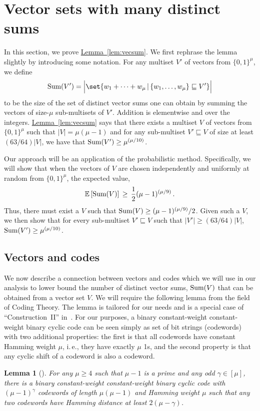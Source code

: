 \documentclass[11pt]{article}
\numberwithin{equation}{section}
\newtheorem{lemma}[theorem]{Lemma}
\theoremstyle{definition}
\theoremstyle{plain}
\newcommand{\ie}{i.\,e.}
\newcommand{\expref}[2]{\hyperref[#2]{#1~\ref{#2}}}
\newcommand{\Vsum}{\ensuremath{\textup{Sum}}}
\newcommand{\ELL}{\ensuremath{\mu}}
\newcommand{\expect}[1]{\mathbb{E}\left[{#1}\right]}
\begin{document}
\section{Vector sets with many distinct sums} \label{sec:proofvecsum}

In this section, we prove \expref{Lemma}{lem:vecsum}.
We first rephrase the lemma slightly by introducing some notation.
For any multiset $V'$ of vectors from $\{0,1\}^\ELL$, we define
\[
\Vsum(V') = \Big| \set{w_1 + \cdots + w_\ELL \,|\, \{w_1,\dots,w_\ELL\} \sqsubseteq  V'} \Big|
\]
to be the size of the  set of distinct vector sums one can obtain by summing the vectors of
%
size-$\mu$    %
sub-multisets of $V'$.
Addition is %
elementwise  %
and over the integers.
\expref{Lemma}{lem:vecsum} says that there exists a multiset $V$ of vectors from     $\{0,1\}^\ELL$ such that $|V|=\ELL(\ELL-1)$ and for any sub-multiset $V'\sqsubseteq V$ of size at least $(63/64)|V|$, we have that $\Vsum(V') \geq \ELL^{(\ELL/10)}$.

Our approach will be an application of the probabilistic method. Specifically, we will show that when the vectors of $V$ are chosen independently and uniformly at random from  $\{0,1\}^\ELL$, the expected value,
\[
\expect{\Vsum(V)}\,\geq\, \frac12 (\ELL-1)^{(\ELL/9)}\,.
\]
Thus, there must exist a $V$ such that $\Vsum(V)\geq (\ELL-1)^{(\ELL/9)}/2$.
Given such a $V$, we then show that for every sub-multiset $V'\sqsubseteq  V$ such that $|V'| \geq (63/64)|V|$,
$\Vsum(V')\geq \ELL^{(\ELL/10)}$.


\subsection{Vectors and codes}

We now describe a connection between vectors and codes which we will use in our analysis to lower bound the number of distinct vector sums, $\Vsum(V)$ that can be obtained from a vector set $V$. We will require the following lemma from the field of Coding Theory.
The lemma is tailored for our needs and is a special
case of ``Construction~II'' in~\cite{AGM:1992}.
For our purposes, a
binary constant-weight  %
constant-weight binary  %
cyclic code can be seen simply as set of
%
%
bit strings   %
(codewords) with two additional properties: the first is that all codewords have constant Hamming weight $\ELL$, \ie, they have exactly $\ELL$ 1s, and the second property is that any cyclic shift of a codeword is also a codeword.

\begin{lemma}[\cite{AGM:1992}]
	\label{lem:cyclic-code}
	For any $\ELL\geq 4$ such that $\ELL-1$ is a prime and any odd $\gamma\in[\ELL]$, there is a
binary constant-weight  %
constant-weight binary  %
cyclic code with $(\ELL-1)^{\gamma}$ codewords of length $\ELL(\ELL-1)$ and Hamming weight $\ELL$ such that any two codewords have Hamming distance at least $2(\ELL-\gamma)$.
\end{lemma}
\end{document}
